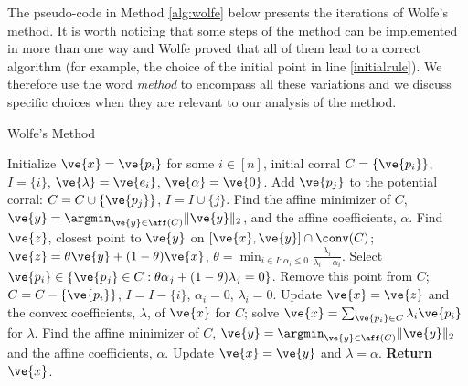 The pseudo-code in Method \ref{alg:wolfe} below presents the iterations of Wolfe's method. It is worth noticing that some steps of the method can be implemented in more than one way and Wolfe proved that all of them lead to a correct algorithm (for example, the choice of the initial point in line \ref{initialrule}). We therefore use the word \emph{method} to encompass all these variations and we discuss specific choices when they are relevant to our analysis of the method.

\begin{algorithm}
\caption{Wolfe's Method \cite{wolfe}}\label{alg:wolfe}
\begin{algorithmic}[1]
\State Initialize $\ve{x} = \ve{p_i}$ for some $i \in [n]$, initial corral $C = \{\ve{p_i}\}$, $I=\{i\}$, $\ve{\lambda} = \ve{e_i}$, $\ve{\alpha} = \ve{0}$.\label{initialrule}
\label{stoppingcriterion}
\State Add $\ve{p_j}$ to the potential corral: $C = C \cup \{\ve{p_j}\}$, $I = I \cup \{j\}$. \label{addrule}
\State Find the affine minimizer of $C$, $\ve{y} = \argmin_{\ve{y} \in \aff(C)} \|\ve{y}\|_2$, and the affine coefficients, $\alpha$.
\State Find $\ve{z}$, closest point to $\ve{y}$ on $[\ve{x},\ve{y}] \cap \conv(C)$; $\ve{z} = \theta \ve{y} + (1-\theta)\ve{x}$,
$\theta = \min_{i \in I : \alpha_i \le 0} \frac{\lambda_i}{\lambda_i - \alpha_i}$.
\State Select $\ve{p_i} \in \{\ve{p_j} \in C : \theta \alpha_j + (1-\theta)\lambda_j = 0\}$.
\State Remove this point from $C$; $C = C - \{\ve{p_i}\}$, $I = I - \{i\}$, $\alpha_i = 0$, $\lambda_i = 0$.
\State Update $\ve{x} = \ve{z}$ and the convex coefficients, $\lambda$, of $\ve{x}$ for $C$; solve $\ve{x} = \sum_{\ve{p_i} \in C} \lambda_i \ve{p_i}$ for $\lambda$.
\State Find the affine minimizer of $C$, $\ve{y} = \argmin_{\ve{y} \in \aff(C)} \|\ve{y}\|_2$ and the affine coefficients, $\alpha$.
\EndWhile
\State Update $\ve{x} = \ve{y}$ and $\lambda = \alpha$.
\EndWhile
\State \textbf{Return} $\ve{x}$.
\EndProcedure
\end{algorithmic}
\end{algorithm}

